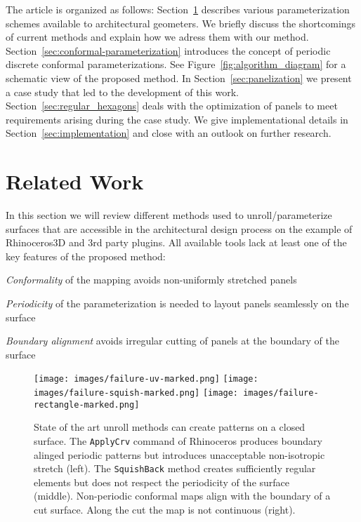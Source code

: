 \documentclass[Thesis.tex]{subfiles}
\begin{document}
The article is organized as follows:
Section~\ref{sec:parameterization} describes various parameterization
schemes available to architectural geometers. We briefly discuss the
shortcomings of current methods and explain how we adress them with our method.
Section~\ref{sec:conformal-parameterization} introduces the concept of
periodic discrete conformal parameterizations.  See
Figure~\ref{fig:algorithm_diagram} for a schematic view of the
proposed method. In Section~\ref{sec:panelization} we present a case
study that led to the development of this
work. Section~\ref{sec:regular_hexagons} deals with the optimization
of panels to meet requirements arising during the case study. We give
implementational details in Section~\ref{sec:implementation} and close
with an outlook on further research.

\section{Related Work}
\label{sec:parameterization}

In this section we will review different methods used to
unroll/parameterize surfaces that are accessible in the architectural
design process on the example of Rhinoceros3D and 3rd party
plugins. All available tools lack at least one of the key features of
the proposed method:
\smallskip
\begin{compactitem}
\item \emph{Conformality} of the mapping avoids non-uniformly stretched
  panels
\item \emph{Periodicity} of the parameterization is needed to layout
  panels seamlessly on the surface
\item \emph{Boundary alignment} avoids irregular cutting of panels 
at the boundary of the surface  
\end{compactitem}

\begin{figure}[tb]
\centering
\texttt{[image: images/failure-uv-marked.png]}
\texttt{[image: images/failure-squish-marked.png]}
\texttt{[image: images/failure-rectangle-marked.png]}
\caption{State of the art unroll methods can create patterns on a
  closed surface.  The {\tt ApplyCrv} command of Rhinoceros produces
  boundary alinged periodic patterns but introduces unacceptable
  non-isotropic stretch (left). The {\tt SquishBack} method creates
  sufficiently regular elements but does not respect the periodicity
  of the surface (middle).  Non-periodic conformal maps align with the
  boundary of a cut surface. Along the cut the map is not continuous
  (right).}
\label{fig:failure}
\end{figure}
\end{document}
